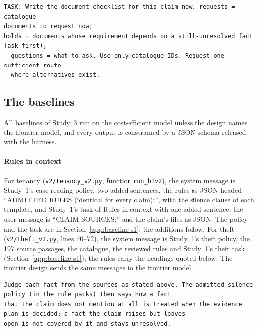 \begin{lstlisting}[title={\textbf{Direct and Rules in context (theft)}}]
TASK: Write the document checklist for this claim now. requests = catalogue
documents to request now;
holds = documents whose requirement depends on a still-unresolved fact (ask first);
  questions = what to ask. Use only catalogue IDs. Request one sufficient route
  where alternatives exist.
\end{lstlisting}

\subsection{The baselines}
\label{app:baseline-prompts}

All baselines of Study~3 run on the cost-efficient model unless the design names the frontier model, and every output is constrained by a JSON schema released with the harness.

\paragraph{Rules in context}
For tenancy (\texttt{v2/\allowbreak{}tenancy\_v2.py}, function \texttt{run\_b1v2}), the system message is Study~1's case-reading policy, two added sentences, the rules as JSON headed ``ADMITTED RULES (identical for every claim):'', with the silence clause of each template, and Study~1's task of Rules in context with one added sentence; the user message is ``CLAIM SOURCES:'' and the claim's files as JSON. The policy and the task are in Section~\ref{app:baseline-s1}; the additions follow. For theft (\texttt{v2/\allowbreak{}theft\_v2.py}, lines 70--72), the system message is Study~1's theft policy, the 197 source passages, the catalogue, the reviewed rules and Study~1's theft task (Section~\ref{app:baseline-s1}); the rules carry the headings quoted below. The frontier design sends the same messages to the frontier model.

\begin{lstlisting}[title={\textbf{Rules in context, tenancy: added to the policy} (\texttt{v2/tenancy\_v2.py}, lines 42--45, verbatim)}]
Judge each fact from the sources as stated above. The admitted silence policy (in the rule packs) then says how a fact
that the claim does not mention at all is treated when the evidence plan is decided; a fact the claim raises but leaves
open is not covered by it and stays unresolved.
\end{lstlisting}

